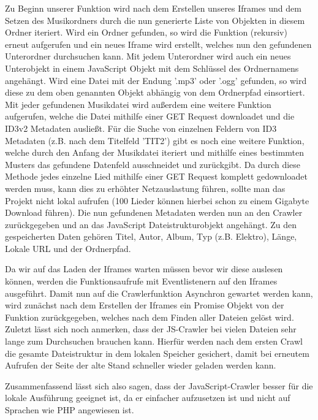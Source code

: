 \documentclass{article}
\begin{document}
\noindent Zu Beginn unserer Funktion wird nach dem Erstellen unseres Iframes und dem Setzen des Musikordners durch die nun generierte Liste von Objekten in diesem Ordner iteriert. Wird ein Ordner gefunden, so wird die Funktion (rekursiv) erneut aufgerufen und ein neues Iframe wird erstellt, welches nun den gefundenen Unterordner durchsuchen kann. Mit jedem Unterordner wird auch ein neues Unterobjekt in einem JavaScript Objekt mit dem Schlüssel des Ordnernamens angehängt. Wird eine Datei mit der Endung '.mp3' oder '.ogg' gefunden, so wird diese zu dem oben genannten Objekt abhängig von dem Ordnerpfad einsortiert. Mit jeder gefundenen Musikdatei wird außerdem eine weitere Funktion aufgerufen, welche die Datei mithilfe einer GET Request downloadet und die ID3v2 Metadaten ausließt. Für die Suche von einzelnen Feldern von ID3 Metadaten (z.B. nach dem Titelfeld 'TIT2') gibt es noch eine weitere Funktion, welche durch den Anfang der Musikdatei iteriert und mithilfe eines bestimmten Musters das gefundene Datenfeld ausschneidet und zurückgibt. Da durch diese Methode jedes einzelne Lied mithilfe einer GET Request komplett gedownloadet werden muss, kann dies zu erhöhter Netzauslastung führen, sollte man das Projekt nicht lokal aufrufen (100 Lieder können hierbei schon zu einem Gigabyte Download führen). Die nun gefundenen Metadaten werden nun an den Crawler zurückgegeben und an das JavaScript Dateistrukturobjekt angehängt. Zu den gespeicherten Daten gehören Titel, Autor, Album, Typ (z.B. Elektro), Länge, Lokale URL und der Ordnerpfad.

\noindent Da wir auf das Laden der Iframes warten müssen bevor wir diese auslesen können, werden die Funktionsaufrufe mit Eventlistenern auf den Iframes ausgeführt. Damit nun auf die Crawlerfunktion Asynchron gewartet werden kann, wird zunächst nach dem Erstellen der Iframes ein Promise Objekt von der Funktion zurückgegeben, welches nach dem Finden aller Dateien gelöst wird.
Zuletzt lässt sich noch anmerken, dass der JS-Crawler bei vielen Dateien sehr lange zum Durchsuchen brauchen kann. Hierfür werden nach dem ersten Crawl die gesamte Dateistruktur in dem lokalen Speicher gesichert, damit bei erneutem Aufrufen der Seite der alte Stand schneller wieder geladen werden kann.\newline

\noindent Zusammenfassend lässt sich also sagen, dass der JavaScript-Crawler besser für die lokale Ausführung geeignet ist, da er einfacher aufzusetzen ist und nicht auf Sprachen wie PHP angewiesen ist. 
\end{document}
